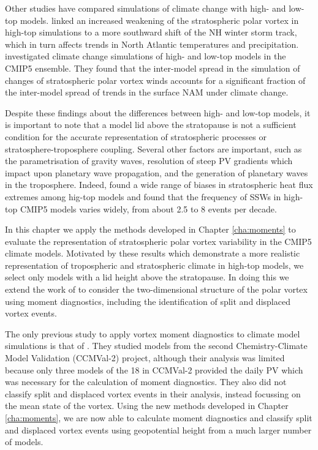 Other studies have compared simulations of climate change with high- and low-top
models. \citet{Huebener2007} linked an increased weakening of the stratospheric
polar vortex in high-top simulations to a more southward shift of the NH winter
storm track, which in turn affects trends in North Atlantic temperatures and
precipitation. \citet{Manzini2014} investigated climate change simulations of
high- and low-top models in the CMIP5 ensemble. They found that the inter-model
spread in the simulation of changes of stratospheric polar vortex winds accounts
for a significant fraction of the inter-model spread of trends in the surface
NAM under climate change. 


Despite these findings about the differences between high- and low-top models,
it is important to note that a model lid above the stratopause is not a
sufficient condition for the accurate representation of stratospheric processes
or stratosphere-troposphere coupling. Several other factors are important, such
as the parametrisation of gravity waves, resolution of steep PV gradients which
impact upon planetary wave propagation, and the generation of planetary waves in
the troposphere. Indeed, \citet{Shaw2014} found a wide range of biases in
stratospheric heat flux extremes among hig-top models and
\citet{Charlton-Perez2013} found that the frequency of SSWs in high-top CMIP5
models varies widely, from about 2.5 to 8 events per decade.

In this chapter we apply the methods developed in Chapter \ref{cha:moments} to
evaluate the representation of stratospheric polar vortex variability in
the CMIP5 climate models. Motivated by these results which demonstrate a more
realistic representation of tropospheric and stratospheric climate in high-top
models, we select only models with a lid height above the stratopause. In doing
this we extend the work of \citet{Charlton-Perez2013} to consider the
two-dimensional structure of the polar vortex using moment diagnostics,
including the identification of split and displaced vortex events.

The only previous study to apply vortex moment diagnostics to climate model
simulations is that of \citet{Mitchell2012a}. They studied models from the
second Chemistry-Climate Model Validation (CCMVal-2) project, although their
analysis was limited because only three models of the 18 in CCMVal-2 provided
the daily PV which was necessary for the calculation of moment diagnostics. They
also did not classify split and displaced vortex events in their analysis,
instead focussing on the mean state of the vortex. Using the new methods
developed in Chapter \ref{cha:moments}, we are now able to calculate moment
diagnostics and classify split and displaced vortex events using geopotential
height from a much larger number of models.

